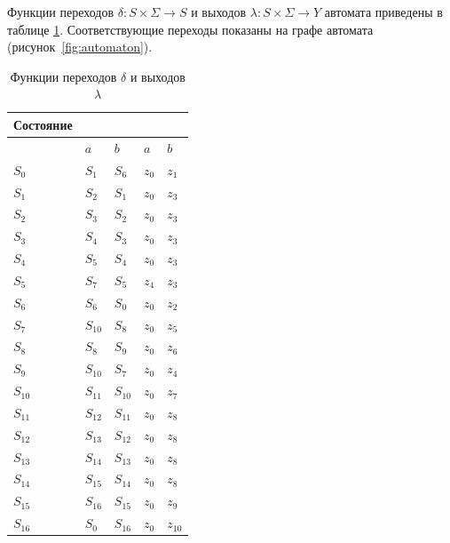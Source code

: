 Функции переходов $\delta: S \times \Sigma \to S$ и выходов
$\lambda: S \times \Sigma \to Y$ автомата приведены в таблице
\ref{tab:transition-output}. Соответствующие переходы показаны на графе
автомата (рисунок~\ref{fig:automaton}).

\begin{table}[H]
\centering
\caption{Функции переходов $\delta$ и выходов $\lambda$}
\label{tab:transition-output}
\small
\setlength{\tabcolsep}{14pt}
\renewcommand{\arraystretch}{1.18}
\begin{tabularx}{\textwidth}{|>{\centering\arraybackslash}X|>{\centering\arraybackslash}X|>{\centering\arraybackslash}X||>{\centering\arraybackslash}X|>{\centering\arraybackslash}X|}
\hline
\rowcolor{tableheaderred}
Состояние & \multicolumn{2}{c||}{\cellcolor{tableheaderred}$\delta$} & \multicolumn{2}{c|}{\cellcolor{tableheaderred}$\lambda$} \\
\cline{2-5}
\rowcolor{tableheaderred}
 & \cellcolor{tableheaderred}$a$ & \cellcolor{tableheaderred}$b$ & \cellcolor{tableheaderred}$a$ & \cellcolor{tableheaderred}$b$ \\
\hline
$S_0$ & $S_1$ & $S_6$ & $z_0$ & $z_1$ \\\hline
$S_1$ & $S_2$ & $S_1$ & $z_0$ & $z_3$ \\\hline
$S_2$ & $S_3$ & $S_2$ & $z_0$ & $z_3$ \\\hline
$S_3$ & $S_4$ & $S_3$ & $z_0$ & $z_3$ \\\hline
$S_4$ & $S_5$ & $S_4$ & $z_0$ & $z_3$ \\\hline
$S_5$ & $S_7$ & $S_5$ & $z_4$ & $z_3$ \\\hline
$S_6$ & $S_6$ & $S_0$ & $z_0$ & $z_2$ \\\hline
$S_7$ & $S_{10}$ & $S_8$ & $z_0$ & $z_5$ \\\hline
$S_8$ & $S_8$ & $S_9$ & $z_0$ & $z_6$ \\\hline
$S_9$ & $S_{10}$ & $S_7$ & $z_0$ & $z_4$ \\\hline
$S_{10}$ & $S_{11}$ & $S_{10}$ & $z_0$ & $z_7$ \\\hline
$S_{11}$ & $S_{12}$ & $S_{11}$ & $z_0$ & $z_8$ \\\hline
$S_{12}$ & $S_{13}$ & $S_{12}$ & $z_0$ & $z_8$ \\\hline
$S_{13}$ & $S_{14}$ & $S_{13}$ & $z_0$ & $z_8$ \\\hline
$S_{14}$ & $S_{15}$ & $S_{14}$ & $z_0$ & $z_8$ \\\hline
$S_{15}$ & $S_{16}$ & $S_{15}$ & $z_0$ & $z_9$ \\\hline
$S_{16}$ & $S_0$ & $S_{16}$ & $z_0$ & $z_{10}$ \\\hline
\hline
\end{tabularx}
\end{table}

